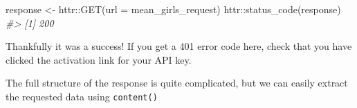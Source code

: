 \documentclass[
  12pt,
]{book}
\newenvironment{Shaded}{\begin{snugshade}}{\end{snugshade}}
\newcommand{\AttributeTok}[1]{\textcolor[rgb]{0.77,0.63,0.00}{#1}}
\newcommand{\CommentTok}[1]{\textcolor[rgb]{0.56,0.35,0.01}{\textit{#1}}}
\newcommand{\FunctionTok}[1]{\textcolor[rgb]{0.00,0.00,0.00}{#1}}
\newcommand{\NormalTok}[1]{#1}
\newcommand{\OtherTok}[1]{\textcolor[rgb]{0.56,0.35,0.01}{#1}}
\newcommand{\SpecialCharTok}[1]{\textcolor[rgb]{0.00,0.00,0.00}{#1}}
\begin{document}
\begin{Shaded}
\begin{Highlighting}[]
\NormalTok{response }\OtherTok{\textless{}{-}}\NormalTok{ httr}\SpecialCharTok{::}\FunctionTok{GET}\NormalTok{(}\AttributeTok{url =}\NormalTok{ mean\_girls\_request)}
\NormalTok{httr}\SpecialCharTok{::}\FunctionTok{status\_code}\NormalTok{(response)}
\CommentTok{\#\textgreater{} [1] 200}
\end{Highlighting}
\end{Shaded}

Thankfully it was a success! If you get a 401 error code here, check that you have clicked the activation link for your API key.

The full structure of the response is quite complicated, but we can easily extract the requested data using \texttt{content()}
\end{document}
